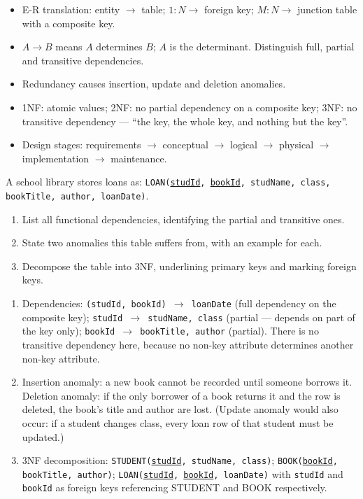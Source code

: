 \documentclass[11pt]{article}
\begin{document}
\begin{aretenir}
\begin{itemize}
\item E-R translation: entity $\to$ table; $1:N \to$ foreign key; $M:N \to$ junction table with a composite key.
\item $A \to B$ means $A$ determines $B$; $A$ is the determinant. Distinguish full, partial and transitive dependencies.
\item Redundancy causes insertion, update and deletion anomalies.
\item 1NF: atomic values; 2NF: no partial dependency on a composite key; 3NF: no transitive dependency — ``the key, the whole key, and nothing but the key''.
\item Design stages: requirements $\to$ conceptual $\to$ logical $\to$ physical $\to$ implementation $\to$ maintenance.
\end{itemize}
\end{aretenir}

\begin{exercice}
A school library stores loans as: \texttt{LOAN(\underline{studId}, \underline{bookId}, studName, class, bookTitle, author, loanDate)}.
\begin{enumerate}
\item List all functional dependencies, identifying the partial and transitive ones.
\item State two anomalies this table suffers from, with an example for each.
\item Decompose the table into 3NF, underlining primary keys and marking foreign keys.
\end{enumerate}
\end{exercice}

\begin{corrige}[Exercise 1]
\begin{enumerate}
\item Dependencies: \texttt{(studId, bookId) $\to$ loanDate} (full dependency on the composite key); \texttt{studId $\to$ studName, class} (partial — depends on part of the key only); \texttt{bookId $\to$ bookTitle, author} (partial). There is no transitive dependency here, because no non-key attribute determines another non-key attribute.
\item Insertion anomaly: a new book cannot be recorded until someone borrows it. Deletion anomaly: if the only borrower of a book returns it and the row is deleted, the book's title and author are lost. (Update anomaly would also occur: if a student changes class, every loan row of that student must be updated.)
\item 3NF decomposition: \texttt{STUDENT(\underline{studId}, studName, class)}; \texttt{BOOK(\underline{bookId}, bookTitle, author)}; \texttt{LOAN(\underline{studId}, \underline{bookId}, loanDate)} with \texttt{studId} and \texttt{bookId} as foreign keys referencing STUDENT and BOOK respectively.
\end{enumerate}
\end{corrige}
\end{document}
